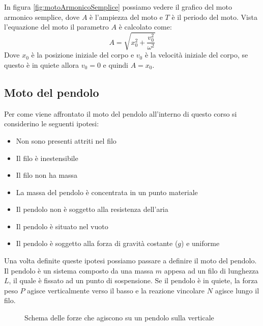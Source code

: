         In figura \ref{fig:motoArmonicoSemplice} possiamo vedere il grafico del moto armonico semplice, dove $A$ è l'ampiezza del moto e $T$ è il periodo del moto. Vista l'equazione del moto il parametro $A$ è calcolato come: $$
            A = \sqrt{x^2_0 + \frac{v_0^2}{\omega^2}} \label{eq:ampiezza}
        $$
        Dove $x_0$ è la posizione iniziale del corpo e $v_0$ è la velocità iniziale del corpo, se questo è in quiete allora $v_0 = 0$ e quindi $A = x_0$.
    \subsection{Moto del pendolo}
        Per come viene affrontato il moto del pendolo all'interno di questo corso si considerino le seguenti ipotesi:
        \begin{itemize}
            \item Non sono presenti attriti nel filo
            \item Il filo è inestensibile
            \item Il filo non ha massa
            \item La massa del pendolo è concentrata in un punto materiale
            \item Il pendolo non è soggetto alla resistenza dell'aria
            \item Il pendolo è situato nel vuoto
            \item Il pendolo è soggetto alla forza di gravità costante ($g$) e uniforme
        \end{itemize}
        Una volta definite queste ipotesi possiamo passare a definire il moto del pendolo. Il pendolo è un sistema composto da una massa $m$ appesa ad un filo di lunghezza $L$, il quale è fissato ad un punto di sospensione.\newline
        Se il pendolo è in quiete, la forza peso $P$ agisce verticalmente verso il basso e la reazione vincolare $N$ agisce lungo il filo.
        
        \begin{figure}[H]
            \centering
            \caption{Schema delle forze che agiscono su un pendolo sulla verticale}
        \end{figure}

